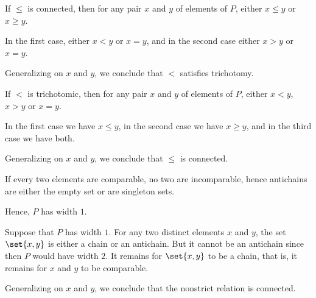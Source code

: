 \begin{defproof}
   If \( {\leq} \) is connected, then for any pair \( x \) and \( y \) of elements of \( P \), either \( x \leq y \) or \( x \geq y \).

  In the first case, either \( x < y \) or \( x = y \), and in the second case either \( x > y \) or \( x = y \).

  Generalizing on \( x \) and \( y \), we conclude that \( {<} \) satisfies trichotomy.

   If \( {<} \) is trichotomic, then for any pair \( x \) and \( y \) of elements of \( P \), either \( x < y \), \( x > y \) or \( x = y \).

  In the first case we have \( x \leq y \), in the second case we have \( x \geq y \), and in the third case we have both.

  Generalizing on \( x \) and \( y \), we conclude that \( {\leq} \) is connected.

   If every two elements are comparable, no two are incomparable, hence antichains are either the empty set or are singleton sets.

  Hence, \( P \) has width \( 1 \).

   Suppose that \( P \) has width \( 1 \). For any two distinct elements \( x \) and \( y \), the set \( \set{ x, y } \) is either a chain or an antichain. But it cannot be an antichain since then \( P \) would have width \( 2 \). It remains for \( \set{ x, y } \) to be a chain, that is, it remains for \( x \) and \( y \) to be comparable.

  Generalizing on \( x \) and \( y \), we conclude that the nonstrict relation is connected.
\end{defproof}

